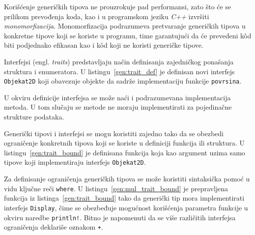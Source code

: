 \documentclass[12pt,oneside]{memoir}
\begin{document}


Korišćenje generičkih tipova ne prouzrokuje pad performansi, zato što će
se prilikom prevođenja koda, kao i u programskom jeziku \textit{C++}
izvršiti \textit{monomorfizacija}. Monomorfizacija
podrazumeva pretvaranje generičkih tipova u konkretne tipove koji se koriste u
programu, time garantujući da će prevedeni kôd biti podjednako efikasan kao
i kôd koji ne koristi generičke tipove.

Interfejsi (engl. \emph{traits}) predstavljaju način definisanja zajedničkog ponašanja
struktura i enumeratora. U listingu~\ref{gen:trait_def} je definisan novi
interfejs \texttt{Objekat2D} koji obavezuje objekte da sadrže implementaciju
funkcije \texttt{povrsina}.



U okviru definicije interfejsa se može naći i podrazumevana implementacija metoda.
U tom slučaju se metode ne moraju implementirati za pojedinačne strukture podataka.

Generički tipovi i interfejsi se mogu koristiti zajedno tako da se obezbedi ograničenje
konkretnih tipova koji se koriste u definiciji funkcija ili struktura. U
listingu~\ref{gen:trait_bound} je definisana funkcija koja kao argument uzima samo
tipove koji implementiraju interfejs \texttt{Objekat2D}.



Za definisanje ograničenja generičkih tipova se može koristiti sintaksička pomoć u
vidu ključne reči \texttt{where}. U listingu~\ref{gen:mul_trait_bound} je prepravljena
funkcija iz listinga~\ref{gen:trait_bound} tako da generički tip mora implementirati
interfejs \texttt{Display}, čime se obezbeđuje mogućnost korišćenja parametra funkcije
u okviru naredbe \texttt{println!}. Bitno je napomenuti da se više različitih interfejsa
ograničenja deklariše oznakom \texttt{+}.


\end{document}
